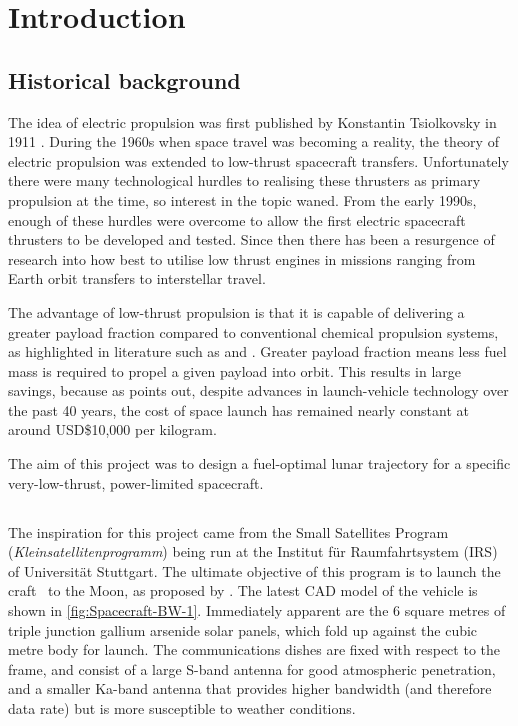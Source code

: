 \chapter{Introduction} \label{cha:Introduction}
 
\section{Historical background} \label{sec:Historical-background}

The idea of electric propulsion was first published by Konstantin Tsiolkovsky in 1911 \parencite{Choueiri2004}. During the 1960s when space travel was becoming a reality, the theory of electric propulsion was extended to low-thrust spacecraft transfers. Unfortunately there were many technological hurdles to realising these thrusters as primary propulsion at the time, so interest in the topic waned. From the early 1990s, enough of these hurdles were overcome to allow the first electric spacecraft thrusters to be developed and tested. Since then there has been a resurgence of research into how best to utilise low thrust engines in missions ranging from Earth orbit transfers to interstellar travel.
 
The advantage of low-thrust propulsion is that it is capable of delivering a greater payload fraction compared to conventional chemical propulsion systems, as highlighted in literature such as \textcite{Kluever1995} and \textcite{Yang2007}. Greater payload fraction means less fuel mass is required to propel a given payload into orbit. This results in large savings, because as \textcite{Manzella2008} points out, despite advances in launch-vehicle technology over the past 40 years, the cost of space launch has remained nearly constant at around USD\$10,000 per kilogram.
 
The aim of this project was to design a fuel-optimal lunar trajectory for a specific very-low-thrust, power-limited spacecraft.

\section{\BW} \label{sec:Spacecraft}

The inspiration for this project came from the Small Satellites Program (\emph{Kleinsatellitenprogramm}) being run at the Institut f\"{u}r Raumfahrtsystem (IRS) of Universit\"{a}t Stuttgart. The ultimate objective of this program is to launch the craft \BW\ to the Moon, as proposed by \textcite{Roeser2006}. The latest CAD model of the vehicle is shown in \autoref{fig:Spacecraft-BW-1}. Immediately apparent are the 6 square metres of triple junction gallium arsenide solar panels, which fold up against the cubic metre body for launch. The communications dishes are fixed with respect to the frame, and consist of a large S-band antenna for good atmospheric penetration, and a smaller Ka-band antenna that provides higher bandwidth (and therefore data rate) but is more susceptible to weather conditions.

